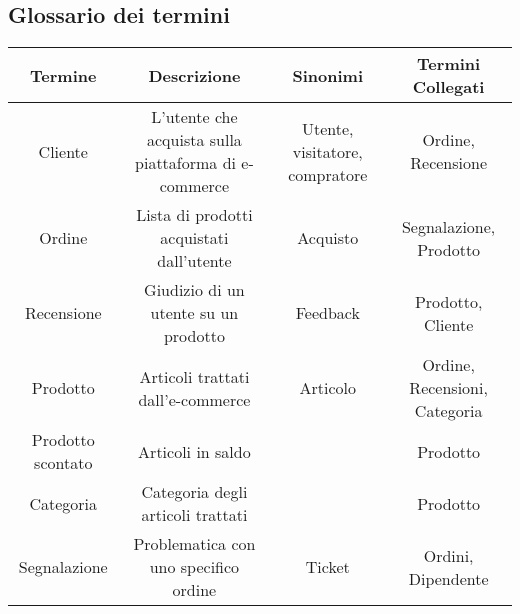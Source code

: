 \subsection{Glossario dei termini}
\begin{center}
\begin{tabular}{ |c|c|c|c|} 
\hline
Termine & Descrizione & Sinonimi & Termini Collegati \\
\hline
\multirow{3}{6em}{Cliente} & \multirow{3}{12em}{L'utente che acquista sulla piattaforma di e-commerce} & \multirow{3}{8em}{Utente, visitatore, compratore} & \multirow{3}{12em}{Ordine, Recensione} \\
 &  &  & \\
 &  &  & \\
\hline

\multirow{3}{6em}{Ordine} & \multirow{3}{12em}{Lista di prodotti acquistati dall'utente} & \multirow{3}{8em}{Acquisto} & \multirow{3}{12em}{Segnalazione, Prodotto} \\
 &  &  & \\
 &  &  & \\
\hline

\multirow{3}{6em}{Recensione} & \multirow{3}{12em}{Giudizio di un utente su un prodotto} & \multirow{3}{8em}{Feedback} & \multirow{3}{12em}{Prodotto, Cliente} \\
 &  &  & \\
 &  &  & \\ 
\hline

\multirow{3}{6em}{Prodotto} & \multirow{3}{12em}{Articoli trattati dall'e-commerce} & \multirow{3}{8em}{Articolo} & \multirow{3}{12em}{Ordine, Recensioni, Categoria} \\
&  &  & \\
&  &  & \\ 
\hline

\multirow{3}{6em}{Prodotto scontato} & \multirow{3}{12em}{Articoli in saldo} & \multirow{3}{8em}{} & \multirow{3}{12em}{Prodotto} \\
&  &  & \\
&  &  & \\ 
\hline

\multirow{3}{6em}{Categoria} & \multirow{3}{12em}{Categoria degli articoli trattati} & \multirow{3}{8em}{} & \multirow{3}{12em}{Prodotto} \\
&  &  & \\
&  &  & \\ 
\hline


\multirow{3}{6em}{Segnalazione} & \multirow{3}{12em}{Problematica con uno specifico ordine} & \multirow{3}{8em}{Ticket} & \multirow{3}{12em}{Ordini, Dipendente} \\
&  &  & \\
&  &  & \\ 
\hline


\end{tabular}
\end{center}
